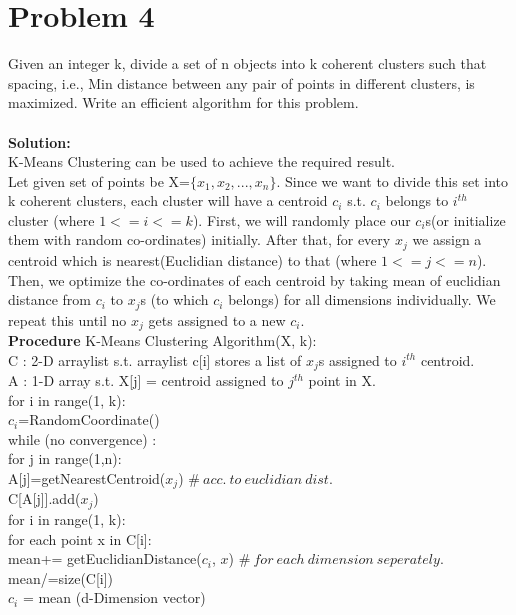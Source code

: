 \documentclass{article}
\newcommand\tab[1][4mm]{\hspace*{#1}}
\begin{document}
\section*{Problem 4}
Given an integer k, divide a set of n objects into k coherent clusters such that spacing, i.e., Min distance between any pair of points in different clusters, is maximized. Write an efficient algorithm for this problem. \\
\vspace{1mm} \\
\textbf{Solution:} \\
K-Means Clustering can be used to achieve the required result. \\
Let given set of points be X=$\{x_1, x_2, . . . , x_n\}$. Since we want to divide this set into k coherent clusters, each cluster will have a centroid $c_i$ s.t. $c_i$ belongs to $i^{th}$ cluster (where $1<=i<=k$). First, we will randomly place our $c_i$s(or initialize them with random co-ordinates) initially. After that, for every $x_j$ we assign a centroid which is nearest(Euclidian distance) to that (where $1<=j<=n$). Then, we optimize the co-ordinates of each centroid by taking mean of euclidian distance from $c_i$ to $x_j$s (to which $c_i$ belongs) for all dimensions individually. We repeat this until no $x_j$ gets assigned to a new $c_i$. \\
\textbf{Procedure} K-Means Clustering Algorithm(X, k): \\
\tab C : 2-D arraylist s.t. arraylist c[i] stores a list of $x_j$s assigned to $i^{th}$ centroid. \\
\tab A : 1-D array s.t. X[j] = centroid assigned to $j^{th}$ point in X. \\
\tab for i in range(1, k): \\
\tab\tab $c_i$=RandomCoordinate() \\
\tab while (no convergence) : \\
\tab\tab for j in range(1,n): \\
\tab\tab\tab A[j]=getNearestCentroid($x_j$) $\#\ acc.\ to\ euclidian\ dist.$ \\
\tab\tab\tab C[A[j]].add($x_j$) \\
\tab\tab for i in range(1, k): \\
\tab\tab\tab for each point x in C[i]: \\
\tab\tab\tab\tab mean+= getEuclidianDistance($c_i$, $x$) $\#\ for\ each\ dimension\ seperately.$ \\
\tab\tab\tab mean/=size(C[i]) \\
\tab\tab\tab $c_i$ = mean (d-Dimension vector) \\
\end{document}
